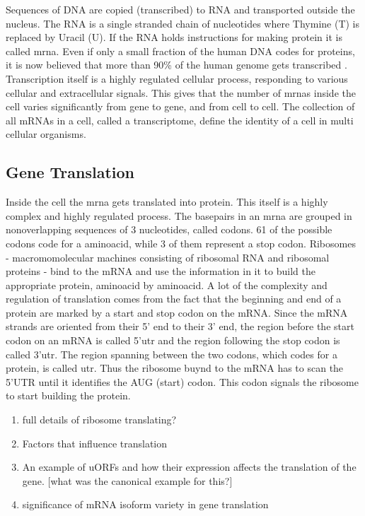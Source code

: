 \documentclass[12pt]{article}
\begin{document}
Sequences of DNA are copied (transcribed) to RNA and transported outside the nucleus. The RNA is a single stranded chain of nucleotides where Thymine (T) is replaced by Uracil (U). If the RNA holds instructions for making protein it is called \gls{mrna}. Even if only a small fraction of the human DNA codes for proteins, it is now believed that more than 90\% of the human genome gets transcribed \cite{Pertea2012}. Transcription itself is a highly regulated cellular process, responding to various cellular and extracellular signals\cite{Hahn2011}. This gives that the number of \acrshort{mrna}s inside the cell varies significantly from gene to gene, and from cell to cell. The collection of all mRNAs in a cell, called a transcriptome, define the identity of a cell in multi cellular organisms. 

\subsection{Gene Translation}
Inside the cell the \acrshort{mrna} gets translated into protein. This itself is a highly complex and highly regulated process. The basepairs in an \acrshort{mrna} are grouped in nonoverlapping sequences of 3 nucleotides, called codons. 61 of the possible codons code for a aminoacid, while 3 of them represent a stop codon. Ribosomes - macromomolecular machines consisting of ribosomal RNA and ribosomal proteins - bind to the mRNA and use the information in it to build the appropriate protein, aminoacid by aminoacid. A lot of the complexity and regulation of translation comes from the fact that the beginning and end of a protein are marked by a start and stop codon on the mRNA. Since the mRNA strands are oriented from their 5' end to their 3' end, the region before the start codon on an mRNA is called 5'\gls{utr} and the region following the stop codon is called 3'\acrshort{utr}. The region spanning  between the two codons, which codes for a protein, is  called \gls{utr}. Thus the ribosome buynd to the mRNA has to scan the 5'UTR until it identifies the AUG (start) codon. This codon signals the ribosome to start building the protein. 

\begin{enumerate}
    \item full details of ribosome translating? 
    \item Factors that influence translation
    \item An example of uORFs and how their expression affects the translation of the gene. [what was the canonical example for this?]
    \item significance of mRNA isoform variety in gene translation
\end{enumerate}
\end{document}
